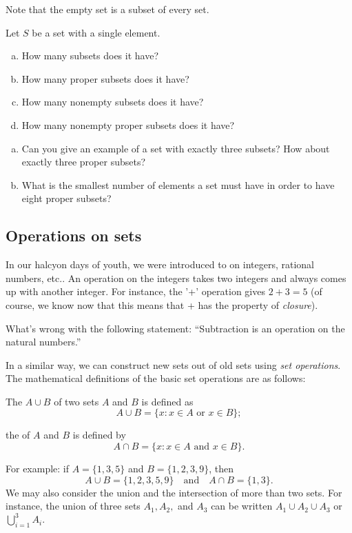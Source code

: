 Note that the empty set is a subset of every set.  

\begin{exercise}
Let $S$ be a set with a single element.
\begin{enumerate}[(a)]
\item
How many subsets does it have?
\item
How many proper subsets does it have?
\item
How many nonempty subsets does it have?
\item
How many nonempty proper subsets does it have?
\end{enumerate}
\end{exercise}

\begin{exercise}\label{exercise:sets:7}
\begin{enumerate}[(a)]
\item
Can you give an example of a set with exactly three subsets? How about exactly three proper subsets?
\item
What is the smallest number of elements a set must have in order to have eight proper subsets?
\end{enumerate}
\end{exercise}

\subsection{Operations on sets}
In our halcyon days of youth, we were introduced to  on integers, rational numbers, etc.. An operation on the integers takes two integers and always comes up with another integer. For instance, the '+' operation gives $2+3=5$ (of course, we know now that this means that + has the property of \emph{closure}).

\begin{exercise}
What's wrong with the following statement: ``Subtraction is an operation on the natural numbers.''
\end{exercise}

In a similar way, we can construct new sets out of old sets using \emph{set operations}. The mathematical definitions of the basic set operations are as follows:

\begin{defn}
The  $A \cup B$ of two sets $A$ and $B$ is defined as  
\[
A \cup B\label{union} = \{x : x \in A \text{ or } x \in B \};
\]
\end{defn}
\begin{defn}
the  of $A$ and $B$  is defined by 
\[
A \cap B\label{intersection} = \{x :  x \in A \text{ and } x \in B \}.
\]
\end{defn}
For example: if $A = \{1, 3, 5\}$ and $B = \{ 1, 2, 3, 9 \}$, then
\[
A \cup B = \{1, 2, 3, 5, 9 \}
\quad \text{and} \quad
A \cap B = \{ 1, 3 \}.
\]
We may also consider the union and the intersection of more than two sets.  For instance,  the union of three sets $A_1, A_2,$ and $A_3$ can be written   $A_{1} \cup A_2 \cup A_3$ or $\bigcup_{i = 1}^{3} A_{i}. $ 

